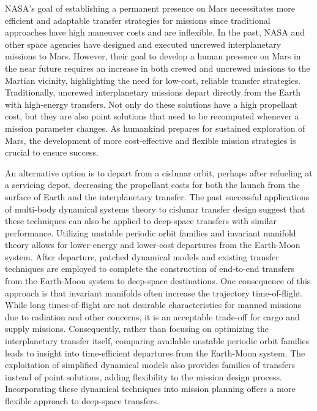 NASA's goal of establishing a permanent presence on Mars necessitates more efficient and adaptable
transfer strategies for missions since traditional approaches have high maneuver costs and are
inflexible. In the past, NASA and other space agencies have designed and executed uncrewed
interplanetary missions to Mars. However, their goal to develop a human presence on Mars in the
near future requires an increase in both crewed and uncrewed missions to the Martian vicinity,
highlighting the need for low-cost, reliable transfer strategies. Traditionally, uncrewed
interplanetary missions depart directly from the Earth with high-energy transfers\cite{Drake:2009}.
Not only do these solutions have a high propellant cost, but they are also point solutions that
need to be recomputed whenever a mission parameter changes. As humankind prepares for sustained
exploration of Mars, the development of more cost-effective and flexible mission strategies is
crucial to ensure success.

An alternative option is to depart from a cislunar orbit, perhaps after refueling at a servicing
depot, decreasing the propellant costs for both the launch from the surface of Earth and the
interplanetary transfer. The past successful applications of multi-body dynamical systems theory to
cislunar transfer design suggest that these techniques can also be applied to deep-space transfers
with similar performance. Utilizing unstable periodic orbit families and invariant manifold theory
allows for lower-energy and lower-cost departures from the Earth-Moon system. After departure,
patched dynamical models and existing transfer techniques are employed to complete the construction
of end-to-end transfers from the Earth-Moon system to deep-space destinations. One consequence of
this approach is that invariant manifolds often increase the trajectory time-of-flight. While long
times-of-flight are not desirable characteristics for manned missions due to radiation and other
concerns, it is an acceptable trade-off for cargo and supply missions. Consequently, rather than
focusing on optimizing the interplanetary transfer itself, comparing available unstable periodic
orbit families leads to insight into time-efficient departures from the Earth-Moon system. The
exploitation of simplified dynamical models also provides families of transfers instead of point
solutions, adding flexibility to the mission design process. Incorporating these dynamical
techniques into mission planning offers a more flexible approach to deep-space transfers.

